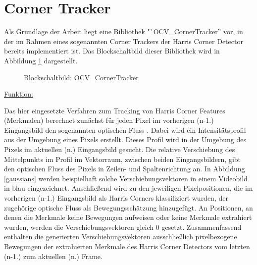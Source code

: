 \section{Corner Tracker}
\label{sec:corner}
Als Grundlage der Arbeit liegt eine Bibliothek "`OCV\_CornerTracker'' vor, in der im Rahmen eines sogenannten Corner Trackers der Harris Corner Detector bereits implementiert ist. Das Blockschaltbild dieser Bibliothek wird in Abbildung \ref{ocv} dargestellt.
\bigskip
\begin{figure}[h]
  \centering
  \caption{Blockschaltbild: OCV\_CornerTracker}
  \label{ocv}
\end{figure}
\begin{flushleft}
\underline{Funktion:}
\end{flushleft}
Das hier eingesetzte Verfahren zum Tracking von Harris Corner Features (Merkmalen) berechnet zunächst für jeden Pixel im vorherigen (n-1.) Eingangsbild den sogenannten optischen Fluss \cite{Baker07adatabase}. Dabei wird ein Intensitätsprofil aus der Umgebung eines Pixels erstellt. Dieses Profil wird in der Umgebung des Pixels im aktuellen (n.) Eingangsbild gesucht. Die relative Verschiebung des Mittelpunkts im Profil im Vektorraum, zwischen beiden Eingangsbildern, gibt den optischen Fluss des Pixels in Zeilen- und Spaltenrichtung an. 
\newpage
In Abbildung \ref{gaussians} werden beispielhaft solche Verschiebungsvektoren in einem Videobild in blau eingezeichnet. Anschließend wird zu den jeweiligen Pixelpositionen, die im vorherigen (n-1.) Eingangsbild als Harris Corners klassifiziert wurden, der zugehörige optische Fluss als Bewegungsschätzung hinzugefügt. An Positionen, an denen die Merkmale keine Bewegungen aufweisen oder keine Merkmale extrahiert wurden, werden die Verschiebungsvektoren gleich 0 gesetzt. Zusammenfassend enthalten die generierten Verschiebungsvektoren ausschließlich pixelbezogene Bewegungen der extrahierten Merkmale des Harris Corner Detectors vom letzten (n-1.) zum aktuellen (n.) Frame.
